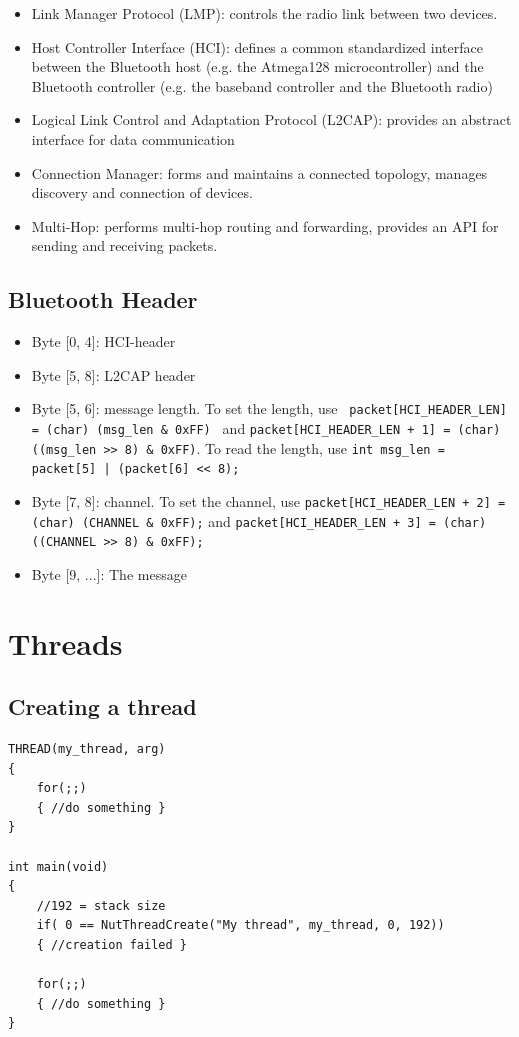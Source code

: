 \begin{itemize}[noitemsep]
\item Link Manager Protocol (LMP): controls the radio link between two devices.
\item Host Controller Interface (HCI): defines a common standardized interface between the Bluetooth host (e.g. the Atmega128 microcontroller) and the Bluetooth controller (e.g. the baseband controller and the Bluetooth radio)
\item Logical Link Control and Adaptation Protocol (L2CAP): provides an abstract interface for data communication
\item Connection Manager: forms and maintains a connected topology, manages discovery and connection of devices.
\item Multi-Hop: performs multi-hop routing and forwarding, provides an API for sending and receiving packets.
\end{itemize}


\subsection{Bluetooth Header}
\begin{itemize}
\item Byte [0, 4]: HCI-header
\item Byte [5, 8]: L2CAP header
\item Byte [5, 6]: message length. To set the length, use \texttt{ packet[HCI\_HEADER\_LEN] = (char) (msg\_len \& 0xFF) } and  \texttt{packet[HCI\_HEADER\_LEN + 1] = (char) ((msg\_len >> 8) \& 0xFF)}. To read the length, use \texttt{int msg\_len = packet[5] | (packet[6] << 8);}
\item Byte [7, 8]: channel. To set the channel, use \texttt{packet[HCI\_HEADER\_LEN + 2] = (char) (CHANNEL \& 0xFF);} and \texttt{packet[HCI\_HEADER\_LEN + 3] = (char) ((CHANNEL >> 8) \& 0xFF);}
\item Byte [9, ...]: The message
\end{itemize}


\section{Threads}

\subsection{Creating a thread}

\begin{lstlisting}[basicstyle=\tiny]
THREAD(my_thread, arg)
{
	for(;;)
	{ //do something }
}

int main(void)
{
	//192 = stack size
	if( 0 == NutThreadCreate("My thread", my_thread, 0, 192)) 
	{ //creation failed }
	
	for(;;)
	{ //do something }
}
\end{lstlisting}


